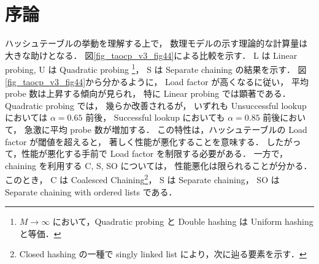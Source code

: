 \chapter{序論}
\label{chap_Introduction}

ハッシュテーブルの挙動を理解する上で，
数理モデルの示す理論的な計算量は大きな助けとなる．
図\ref{fig_taocp_v3_fig44}に\cite{knuth1998}よる比較を示す．
L は Linear probing,
U は Quadratic probing \footnote{$M \rightarrow \infty$ において，Quadratic probing と Double hashing は Uniform hashing と等価．}，
S は Separate chaining の結果を示す．
図\ref{fig_taocp_v3_fig44}から分かるように，
Load factor が高くなるに従い，
平均 probe 数は上昇する傾向が見られ，
特に Linear probing では顕著である．
Quadratic probing では，
幾らか改善されるが，
いずれも
Unsuccessful lookup においては $\alpha = 0.65$ 前後，
Successful lookup においても $\alpha = 0.85$ 前後において，
急激に平均 probe 数が増加する．
この特性は，ハッシュテーブルの Load factor が閾値を超えると，
著しく性能が悪化することを意味する．
したがって，性能が悪化する手前で Load factor を制限する必要がある．
一方で，chaining を利用する C, S, SO については，
性能悪化は限られることが分かる．
このとき，
C は Coalesced Chaining\footnote{Closed hashing の一種で singly linked list により，次に辿る要素を示す．}，
S は Separate chaining，
SO は Separate chaining with ordered lists である．




